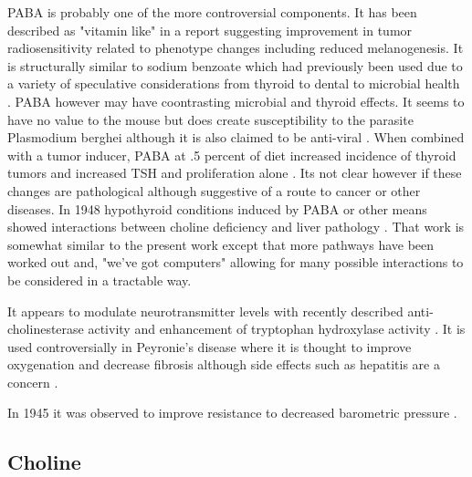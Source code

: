 PABA is probably one of the more controversial components.
It has been described as "vitamin like" in a report suggesting
improvement in tumor radiosensitivity related to phenotype changes
including reduced melanogenesis\cite{XAVIER2006517}.
It is structurally  similar to sodium benzoate which had previously
been used due to a
variety of speculative considerations from thyroid to dental to
microbial health 
\cite{marchywka-MJM-2024-010-0.01rg}
\cite{marchywka-MJM-2022-013-0.10}
.
PABA however may have coontrasting microbial and thyroid effects.
It seems to have no value to the mouse but does create susceptibility
to the parasite  Plasmodium berghei \cite{JACOBS1964213}
although it is also claimed to be anti-viral \cite{Akberova2002}.
When combined with a  tumor inducer, PABA at .5 percent of diet
increased incidence of thyroid tumors and increased TSH 
and proliferation alone \cite{PMID15843508}. Its not clear
however if these changes are pathological although suggestive
of a route to cancer or other diseases. 
In 1948 hypothyroid conditions induced by
PABA or other means showed interactions between choline deficiency
and liver pathology \cite{HANDLER1948669}. That work is somewhat
similar to the present work except that more pathways have been
worked out and, "we've got computers"  allowing for many possible
interactions to be considered in a tractable way. 

It appears to modulate neurotransmitter levels
with recently described anti-cholinesterase activity 
\cite{PMC10604881}
and enhancement of  tryptophan hydroxylase activity 
\cite{Chen_Su_Wu_Molecular_mechanisms_therapeutic_2025}.
It is used controversially in Peyronie's disease where it is thought to
improve oxygenation and decrease fibrosis 
although side effects such as hepatitis are a concern \cite{ROY20082967}.


In 1945 it was observed to improve resistance to decreased barometric
pressure \cite{10.1210/endo-37-4-223}.

\subsection{Choline}

